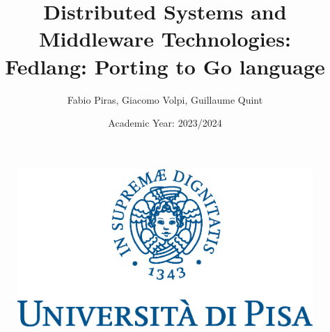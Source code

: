 

\author{Fabio Piras, Giacomo Volpi, Guillaume Quint}
\title{Distributed Systems and Middleware Technologies:\\
Fedlang: Porting to Go language}
\date{Academic Year: 2023/2024}

\begin{figure}
\centering

\includegraphics[scale=0.75]{./images/cherubino}

\end{figure}
\maketitle
\thispagestyle{empty}
\newpage

\tableofcontents


\thispagestyle{empty}



